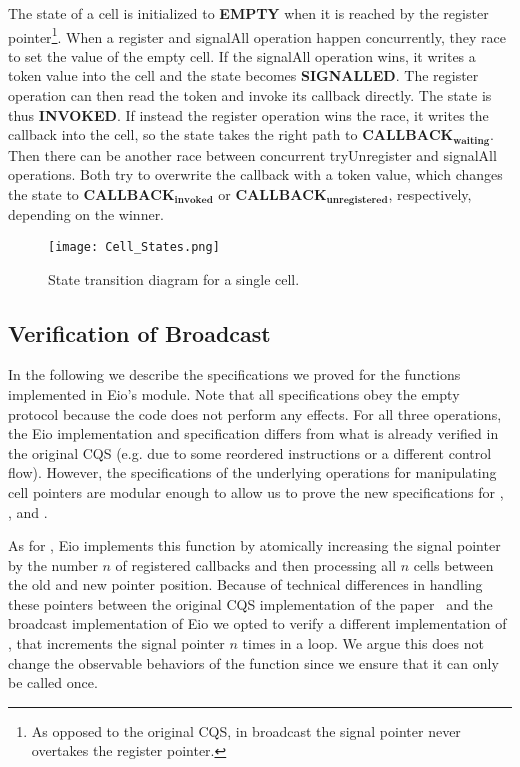 The state of a cell is initialized to \textbf{EMPTY} when it is reached by the register pointer\footnote{As opposed to the original CQS, in broadcast the signal pointer never overtakes the register pointer.}.
When a register and signalAll operation happen concurrently, they race to set the value of the empty cell.
If the signalAll operation wins, it writes a token value into the cell and the state becomes \textbf{SIGNALLED}.
The register operation can then read the token and invoke its callback directly.
The state is thus \textbf{INVOKED}.
If instead the register operation wins the race, it writes the callback into the cell, so the state takes the right path to \(\textbf{CALLBACK}_\textbf{waiting}\).
Then there can be another race between concurrent tryUnregister and signalAll operations.
Both try to overwrite the callback with a token value, which changes the state to \(\textbf{CALLBACK}_\textbf{invoked}\) or \(\textbf{CALLBACK}_\textbf{unregistered}\), respectively, depending on the winner.

\begin{figure}[ht]
  \texttt{[image: Cell\_States.png]}
  \caption{State transition diagram for a single cell.}
  \label{fig:cqs-cell-states}
\end{figure}

\subsection{Verification of Broadcast}
\label{sec:broadcast-spec}

In the following we describe the specifications we proved for the functions implemented in Eio's  module.
Note that all specifications obey the empty protocol because the code does not perform any effects.
For all three operations, the Eio implementation and specification differs from what is already verified in the original CQS (e.g. due to some reordered instructions or a different control flow).
However, the specifications of the underlying operations for manipulating cell pointers are modular enough to allow us to prove the new specifications for , , and .

As for , Eio implements this function by atomically increasing the signal pointer by the number \(n\) of registered callbacks and then processing all \(n\) cells between the old and new pointer position.
Because of technical differences in handling these pointers between the original CQS implementation of the paper~\cite{koval2023cqs} and the broadcast implementation of Eio we opted to verify a different implementation of , that increments the signal pointer \(n\) times in a loop.
We argue this does not change the observable behaviors of the function since we ensure that it can only be called once.

